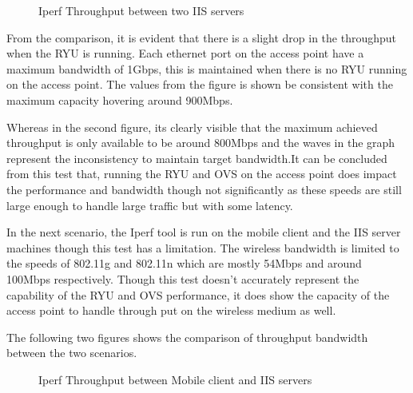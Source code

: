 \begin{figure}[H]
	\centering
	\hfill
	\caption{Iperf Throughput between two IIS servers}
\end{figure}

From the comparison, it is evident that there is a slight drop in the throughput when the RYU is running. Each ethernet port on the access point have a maximum bandwidth of 1Gbps, this is maintained when there is no RYU running on the access point. The values from the figure is shown be consistent with the maximum capacity hovering around 900Mbps. 

Whereas in the second figure, its clearly visible that the maximum achieved throughput is only available to be around 800Mbps and the waves in the graph represent the inconsistency to maintain target bandwidth.It can be concluded from this test that, running the RYU and OVS on the access point does impact the performance and bandwidth though not significantly as these speeds are still large enough to handle large traffic but with some latency.

In the next scenario, the Iperf tool is run on the mobile client and the IIS server machines though this test has a limitation. The wireless bandwidth is limited to the speeds of 802.11g and 802.11n which are mostly 54Mbps and around 100Mbps respectively. Though this test doesn’t accurately represent the capability of the RYU and OVS performance, it does show the capacity of the access point to handle through put on the wireless medium as well.

The following two figures shows the comparison of throughput bandwidth between the two scenarios.

\begin{figure}[H]
	\centering
	\hfill
	\caption{Iperf Throughput between Mobile client and IIS servers}
\end{figure}

